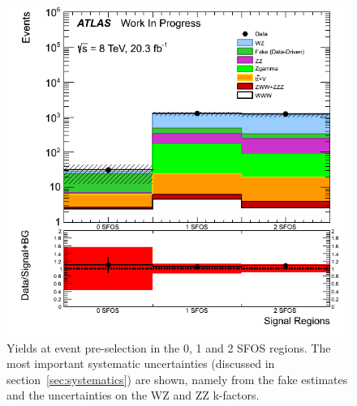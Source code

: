 \begin{figure}[ht!]
\centering
\includegraphics[width=0.5\columnwidth]{figures/SFOSPreselection.png}
\caption{Yields at event pre-selection in the 0, 1 and 2 SFOS regions.  
The most important systematic uncertainties 
(discussed in section~\ref{sec:systematics}) are shown, 
namely from the fake estimates and the uncertainties on the WZ and ZZ k-factors.}
\label{fig:preselection_nsfos}
\end{figure}

